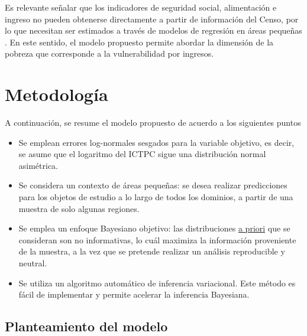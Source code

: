 \documentclass[11pt]{article}
\begin{document}
Es relevante señalar que los indicadores de seguridad social, alimentación e ingreso no pueden obtenerse directamente a partir de información del Censo, por lo que necesitan ser estimados a través de modelos de regresión en áreas pequeñas \parencite{coneval:2020}. En este sentido, el modelo propuesto permite abordar la dimensión de la pobreza que corresponde a la vulnerabilidad por ingresos.

\section{Metodología}
\label{sec:metodologia}

A continuación, se resume el modelo propuesto de acuerdo a los siguientes puntos
\begin{itemize}
\item Se emplean errores log-normales sesgados para la variable objetivo, es decir, se asume que el logaritmo del ICTPC sigue una distribución normal asimétrica.

\item Se considera un contexto de áreas pequeñas: se desea realizar predicciones para los objetos de estudio a lo largo de todos los dominios, a partir de una muestra de solo algunas regiones.

\item Se emplea un enfoque Bayesiano objetivo: las distribuciones \underline{a priori} que se consideran son no informativas, lo cuál maximiza la información proveniente de la muestra, a la vez que se pretende realizar un análisis reproducible y neutral.

\item Se utiliza un algoritmo automático de inferencia variacional.
Este método es fácil de implementar y permite acelerar la inferencia Bayesiana.
\end{itemize}

\subsection{Planteamiento del modelo}
\label{subsec:modelo-propuesto}
\end{document}

